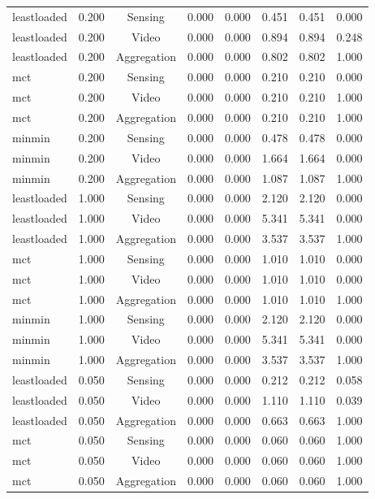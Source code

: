 \begin{table}
\begin{tabular}{lccccccc}
leastloaded & 0.200 & Sensing & 0.000 & 0.000 & 0.451 & 0.451 & 0.000 \\
leastloaded & 0.200 & Video & 0.000 & 0.000 & 0.894 & 0.894 & 0.248 \\
leastloaded & 0.200 & Aggregation & 0.000 & 0.000 & 0.802 & 0.802 & 1.000 \\
mct & 0.200 & Sensing & 0.000 & 0.000 & 0.210 & 0.210 & 0.000 \\
mct & 0.200 & Video & 0.000 & 0.000 & 0.210 & 0.210 & 1.000 \\
mct & 0.200 & Aggregation & 0.000 & 0.000 & 0.210 & 0.210 & 1.000 \\
minmin & 0.200 & Sensing & 0.000 & 0.000 & 0.478 & 0.478 & 0.000 \\
minmin & 0.200 & Video & 0.000 & 0.000 & 1.664 & 1.664 & 0.000 \\
minmin & 0.200 & Aggregation & 0.000 & 0.000 & 1.087 & 1.087 & 1.000 \\
leastloaded & 1.000 & Sensing & 0.000 & 0.000 & 2.120 & 2.120 & 0.000 \\
leastloaded & 1.000 & Video & 0.000 & 0.000 & 5.341 & 5.341 & 0.000 \\
leastloaded & 1.000 & Aggregation & 0.000 & 0.000 & 3.537 & 3.537 & 1.000 \\
mct & 1.000 & Sensing & 0.000 & 0.000 & 1.010 & 1.010 & 0.000 \\
mct & 1.000 & Video & 0.000 & 0.000 & 1.010 & 1.010 & 0.000 \\
mct & 1.000 & Aggregation & 0.000 & 0.000 & 1.010 & 1.010 & 1.000 \\
minmin & 1.000 & Sensing & 0.000 & 0.000 & 2.120 & 2.120 & 0.000 \\
minmin & 1.000 & Video & 0.000 & 0.000 & 5.341 & 5.341 & 0.000 \\
minmin & 1.000 & Aggregation & 0.000 & 0.000 & 3.537 & 3.537 & 1.000 \\
leastloaded & 0.050 & Sensing & 0.000 & 0.000 & 0.212 & 0.212 & 0.058 \\
leastloaded & 0.050 & Video & 0.000 & 0.000 & 1.110 & 1.110 & 0.039 \\
leastloaded & 0.050 & Aggregation & 0.000 & 0.000 & 0.663 & 0.663 & 1.000 \\
mct & 0.050 & Sensing & 0.000 & 0.000 & 0.060 & 0.060 & 1.000 \\
mct & 0.050 & Video & 0.000 & 0.000 & 0.060 & 0.060 & 1.000 \\
mct & 0.050 & Aggregation & 0.000 & 0.000 & 0.060 & 0.060 & 1.000 \\

\end{tabular}
\end{table}
